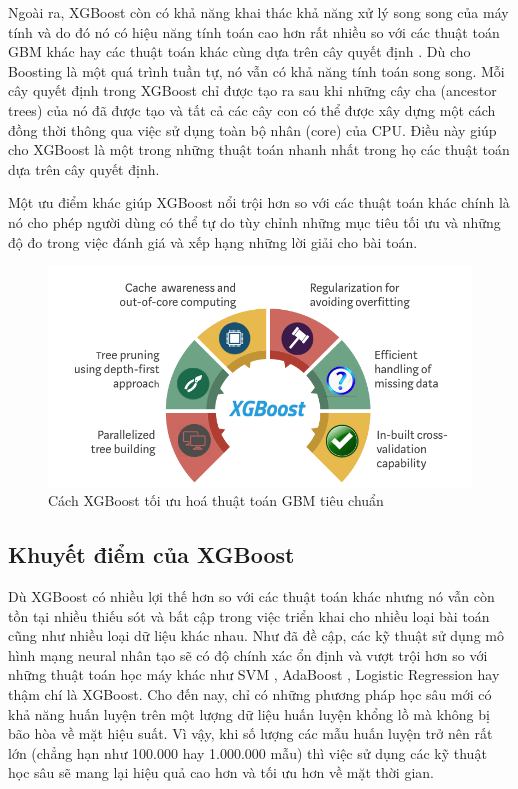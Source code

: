 \documentclass{article}
\begin{document}
Ngoài ra, XGBoost còn có khả năng khai thác khả năng xử lý song song của máy tính và do đó nó có hiệu năng tính toán cao hơn rất nhiều so với các thuật toán GBM khác hay các thuật toán khác cùng dựa trên cây quyết định \cite{advantage_XGBoost}. Dù cho Boosting là một quá trình tuần tự, nó vẫn có khả năng tính toán song song. Mỗi cây quyết định trong XGBoost chỉ được tạo ra sau khi những cây cha (ancestor trees) của nó đã được tạo và tất cả các cây con có thể được xây dựng một cách đồng thời thông qua việc sử dụng toàn bộ nhân (core) của CPU. Điều này giúp cho XGBoost là một trong những thuật toán nhanh nhất trong họ các thuật toán dựa trên cây quyết định.

Một ưu điểm khác giúp XGBoost nổi trội hơn so với các thuật toán khác chính là nó cho phép người dùng có thể tự do tùy chỉnh những mục tiêu tối ưu và những độ đo trong việc đánh giá và xếp hạng những lời giải cho bài toán.

\begin{center} 
\begin{figure}[!h]
    \centering
    \includegraphics[scale=0.28]{optimize.png}
    \caption{Cách XGBoost tối ưu hoá thuật toán GBM tiêu chuẩn \cite{An-xgboost}}
    \label{fig:optimize}
\end{figure}
\end{center}
  
\subsection{Khuyết điểm của XGBoost} 

Dù XGBoost có nhiều lợi thế hơn so với các thuật toán khác nhưng nó vẫn còn tồn tại nhiều thiếu sót và bất cập trong việc triển khai cho nhiều loại bài toán cũng như nhiều loại dữ liệu khác nhau. Như đã đề cập, các kỹ thuật sử dụng mô hình mạng neural nhân tạo sẽ có độ chính xác ổn định và vượt trội hơn so với những thuật toán học máy khác như SVM \cite{svm}, AdaBoost \cite{adaboost}, Logistic Regression \cite{logisticregression} hay thậm chí là XGBoost. Cho đến nay, chỉ có những phương pháp học sâu mới có khả năng huấn luyện trên một lượng dữ liệu huấn luyện khổng lồ mà không bị bão hòa về mặt hiệu suất. Vì vậy, khi số lượng các mẫu huấn luyện trở nên rất lớn (chẳng hạn như 100.000 hay 1.000.000 mẫu) thì việc sử dụng các kỹ thuật học sâu sẽ mang lại hiệu quả cao hơn và tối ưu hơn về mặt thời gian.
\end{document}
